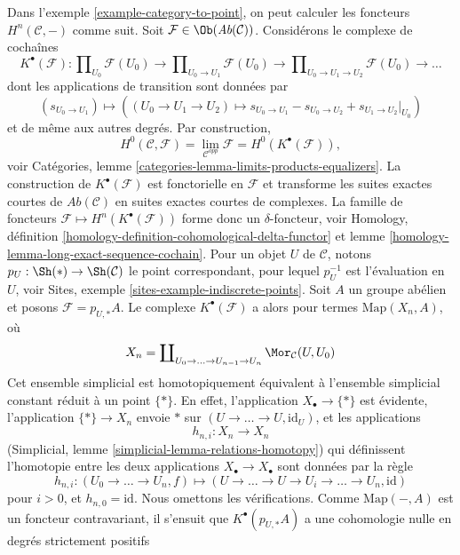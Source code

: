\begin{example}
\label{example-right-derived-limits}
Dans l'exemple \ref{example-category-to-point}, on peut calculer les
foncteurs $H^n(\mathcal{C}, -)$ comme suit. Soit
$\mathcal{F} \in \Ob(\textit{Ab}(\mathcal{C}))$. Considérons le complexe de
cochaînes
$$
K^\bullet(\mathcal{F}) :
\prod\nolimits_{U_0} \mathcal{F}(U_0)
\to
\prod\nolimits_{U_0 \to U_1} \mathcal{F}(U_0)
\to
\prod\nolimits_{U_0 \to U_1 \to U_2} \mathcal{F}(U_0)
\to \ldots
$$
dont les applications de transition sont données par
$$
(s_{U_0 \to U_1})
\longmapsto
((U_0 \to U_1 \to U_2) \mapsto s_{U_0 \to U_1} - s_{U_0 \to U_2}
+ s_{U_1 \to U_2}|_{U_0})
$$
et de même aux autres degrés. Par construction,
$$
H^0(\mathcal{C}, \mathcal{F}) =
\lim_{\mathcal{C}^{opp}} \mathcal{F} =
H^0(K^\bullet(\mathcal{F})),
$$
voir Catégories, lemme
\ref{categories-lemma-limits-products-equalizers}. La construction de
$K^\bullet(\mathcal{F})$ est fonctorielle en $\mathcal{F}$ et transforme les
suites exactes courtes de $\textit{Ab}(\mathcal{C})$ en suites exactes
courtes de complexes. La famille de foncteurs
$\mathcal{F} \mapsto H^n(K^\bullet(\mathcal{F}))$ forme donc un
$\delta$-foncteur, voir Homology, définition
\ref{homology-definition-cohomological-delta-functor} et lemme
\ref{homology-lemma-long-exact-sequence-cochain}. Pour un objet $U$ de
$\mathcal{C}$, notons $p_U : \Sh(*) \to \Sh(\mathcal{C})$ le point
correspondant, pour lequel $p_U^{-1}$ est l'évaluation en $U$, voir Sites,
exemple \ref{sites-example-indiscrete-points}. Soit $A$ un groupe abélien et
posons $\mathcal{F} = p_{U, *}A$. Le complexe $K^\bullet(\mathcal{F})$ a alors
pour termes $\text{Map}(X_n, A)$, où
$$
X_n = \coprod\nolimits_{U_0 \to \ldots \to U_{n - 1} \to U_n}
\Mor_\mathcal{C}(U, U_0)
$$
Cet ensemble simplicial est homotopiquement équivalent à l'ensemble
simplicial constant réduit à un point $\{*\}$. En effet, l'application
$X_\bullet \to \{*\}$ est évidente, l'application $\{*\} \to X_n$ envoie
$*$ sur $(U \to \ldots \to U, \text{id}_U)$, et les applications
$$
h_{n, i} : X_n \longrightarrow X_n
$$
(Simplicial, lemme \ref{simplicial-lemma-relations-homotopy}) qui définissent
l'homotopie entre les deux applications
$X_\bullet \to X_\bullet$ sont données par la règle
$$
h_{n, i} :
(U_0 \to \ldots \to U_n, f)
\longmapsto
(U \to \ldots \to U \to U_i \to \ldots \to U_n, \text{id})
$$
pour $i > 0$, et $h_{n, 0} = \text{id}$. Nous omettons les vérifications.
Comme $\text{Map}(-, A)$ est un foncteur contravariant, il s'ensuit que
$K^\bullet(p_{U, *}A)$ a une cohomologie nulle en degrés strictement positifs

\end{example}
